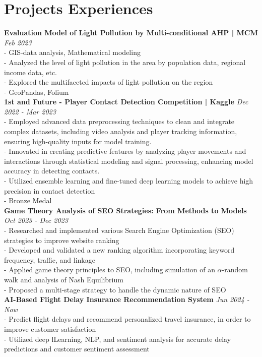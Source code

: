 \documentclass[a4paper,10pt]{article}
\begin{document}
\section*{Projects Experiences}
\textbf{Evaluation Model of Light Pollution by Multi-conditional AHP | MCM} \hfill \textit{Feb 2023}\\
- GIS-data analysis, Mathematical modeling\\
- Analyzed the level of light pollution in the area by population data, regional income data, etc.\\
- Explored the multifaceted impacts of light pollution on the region\\
- GeoPandas, Folium\\
\textbf{1st and Future - Player Contact Detection Competition | Kaggle} \hfill \textit{Dec 2022 - Mar 2023}\\
- Employed advanced data preprocessing techniques to clean and integrate complex datasets, including video analysis and player tracking information, ensuring high-quality inputs for model training.\\
- Innovated in creating predictive features by analyzing player movements and interactions through statistical modeling and signal processing, enhancing model accuracy in detecting contacts.\\
- Utilized ensemble learning and fine-tuned deep learning models to achieve high precision in contact detection\\
- Bronze Medal\\
\textbf{Game Theory Analysis of SEO Strategies: From Methods to Models} \hfill \textit{Oct 2023 - Dec 2023}\\
- Researched and implemented various Search Engine Optimization (SEO) strategies to improve website ranking\\
- Developed and validated a new ranking algorithm incorporating keyword frequency, traffic, and linkage\\
- Applied game theory principles to SEO, including simulation of an $\alpha$-random walk and analysis of Nash Equilibrium\\
- Proposed a multi-stage strategy to handle the dynamic nature of SEO\\
\textbf{AI-Based Flight Delay  Insurance Recommendation System} \hfill \textit{Jun 2024 - Now}\\
- Predict flight delays and recommend personalized travel insurance, in order to improve customer satisfaction\\
- Utilized deep lLearning, NLP, and sentiment analysis for accurate delay predictions and customer sentiment assessment\\
\end{document}
